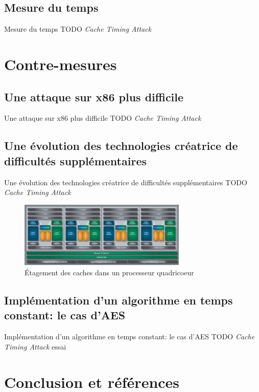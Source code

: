 \documentclass[11pt]{beamer}
\begin{document}
\subsection{Mesure du temps}
\begin{frame}{Mesure du temps}
TODO \emph{Cache Timing Attack} 
\end{frame}

\section{Contre-mesures}

\subsection{Une attaque sur x86 plus difficile}
\begin{frame}{Une attaque sur x86 plus difficile}
TODO \emph{Cache Timing Attack} 
\end{frame}

\subsection{Une évolution des technologies créatrice de difficultés supplémentaires}
\begin{frame}{Une évolution des technologies créatrice de difficultés supplémentaires}
TODO \emph{Cache Timing Attack} 
\begin{figure}[h]
  \centering
  \includegraphics[width=8cm]{figures/BDArch.png}
  \caption{Étagement des caches dans un processeur quadricoeur}
  \label{etagement} 
\end{figure}
\end{frame}

\subsection{Implémentation d'un algorithme en temps constant: le cas d'AES}
\begin{frame}{Implémentation d'un algorithme en temps constant: le cas d'AES}
TODO \emph{Cache Timing Attack} essai~\cite{canteaut2006understanding}
\end{frame}

\section*{Conclusion et  références}
\end{document}
